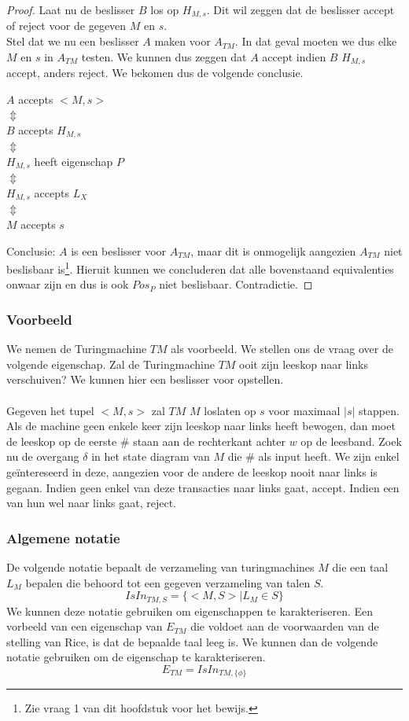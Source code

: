 \begin{proof}
	Laat nu de beslisser $B$ los op $H_{M,s}$. Dit wil zeggen dat de beslisser accept of reject voor de gegeven $M$ en $s$.\\
	Stel dat we nu een beslisser $A$ maken voor $A_{TM}$. In dat geval moeten we dus elke $M$ en $s$ in $A_{TM}$ testen. We kunnen dus zeggen dat $A$ accept indien $B$ $H_{M,s}$ accept, anders reject. We bekomen dus de volgende conclusie.
	\begin{center}
		$A$ accepts $<M,s>$\\
		$\Updownarrow$\\
		$B$ accepts $H_{M,s}$\\
		$\Updownarrow$\\
		$H_{M,s}$ heeft eigenschap $P$\\
		$\Updownarrow$\\
		$H_{M,s}$ accepts $L_X$\\
		$\Updownarrow$\\
		$M$ accepts $s$
	\end{center}
	Conclusie: $A$ is een beslisser voor $A_{TM}$, maar dit is onmogelijk aangezien $A_{TM}$ niet beslisbaar is\footnote{Zie vraag 1 van dit hoofdstuk voor het bewijs.}. Hieruit kunnen we concluderen dat alle bovenstaand equivalenties onwaar zijn en dus is  ook $Pos_P$ niet beslisbaar. Contradictie.
\end{proof}

\subsubsection*{Voorbeeld}

We nemen de Turingmachine $TM$ als voorbeeld. We stellen ons de vraag over de volgende eigenschap. Zal de Turingmachine $TM$ ooit zijn leeskop naar links verschuiven? We kunnen hier een beslisser voor opstellen.
\\\\
Gegeven het tupel $<M,s>$ zal $TM$ $M$ loslaten op $s$ voor maximaal $|s|$ stappen. Als de machine geen enkele keer zijn leeskop naar links heeft bewogen, dan moet de leeskop op de eerste $\#$ staan aan de rechterkant achter $w$ op de leesband. Zoek nu de overgang $\delta$ in het state diagram van $M$ die $\#$ als input heeft. We zijn enkel ge\"intereseerd in deze, aangezien voor de andere de leeskop nooit naar links is gegaan. Indien geen enkel van deze transacties naar links gaat, accept. Indien een van hun wel naar links gaat, reject.

\subsubsection*{Algemene notatie}

De volgende notatie bepaalt de verzameling van turingmachines $M$ die een taal $L_M$ bepalen die behoord tot een gegeven verzameling van talen $S$.
$$IsIn_{TM,S}=\{<M,S>|L_M \in S\}$$
We kunnen deze notatie gebruiken om eigenschappen te karakteriseren. Een vorbeeld van een eigenschap van $E_{TM}$ die voldoet aan de voorwaarden van de stelling van Rice, is dat de bepaalde taal leeg is. We kunnen dan de volgende notatie gebruiken om de eigenschap te karakteriseren.
$$E_{TM} = IsIn_{TM,\{\phi\}}$$
